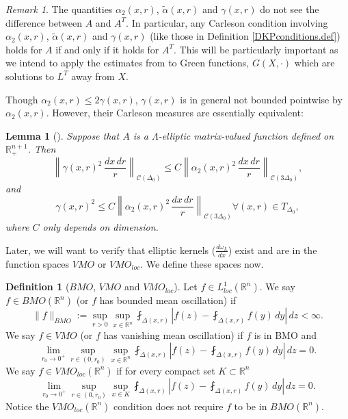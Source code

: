 \documentclass[11pt, a4paper,leqno]{amsart}
\theoremstyle{plain}
\newtheorem{lemma}[equation]{Lemma}
\theoremstyle{definition}
\newtheorem{definition}[equation]{Definition}
\theoremstyle{remark}
\newtheorem{remark}[equation]{Remark}
\numberwithin{equation}{section}
\newcommand{\rn}{\mathbb{R}^n}
\newcommand{\hm}{\omega}
\begin{document}
\begin{remark}\label{AvsAt.rmk}
 The quantities $\alpha_2(x,r)$,  $\tilde{\alpha}(x,r)$ and $\gamma(x,r)$ do not see the difference between $A$ and $A^T$. In particular, any Carleson condition involving $\alpha_2(x,r)$,  $\tilde{\alpha}(x,r)$ and $\gamma(x,r)$ (like those in Definition \ref{DKPconditions.def}) holds for $A$ if and only if it holds for $A^T$. This will be particularly important as we intend to apply the estimates from \cite{DLM} to Green functions, $G(X, \cdot)$ which are solutions to $L^T$ away from $X$.
\end{remark}

Though $\alpha_2(x,r) \leq 2\gamma(x,r)$, $\gamma(x,r)$ is in general not bounded pointwise by $\alpha_2(x,r)$. However, their Carleson measures are essentially equivalent:
%
\begin{lemma}[{\cite[Remark 4.22]{DLM}}]\label{gammabdalpha.lem}
Suppose that $A$ is a $\Lambda$-elliptic matrix-valued function defined on $\mathbb{R}^{n+1}_+$. Then
\[\left\|\gamma(x,r)^2 \, \frac{dx \, dr}{r} \right\|_{\mathcal{C}(\Delta_0)} \le C \left\|\alpha_2(x,r)^2 \, \frac{dx \, dr}{r} \right\|_{\mathcal{C}(3\Delta_0)},\]
and
\[\gamma(x,r)^2 \le C \left\|\alpha_2(x,r)^2 \, \frac{dx \, dr}{r} \right\|_{\mathcal{C}(3\Delta_0)} \forall (x,r) \in T_{\Delta_0},\]
where $C$ only depends on dimension.
\end{lemma}

Later, we will want to verify that elliptic kernels ($\tfrac{d\hm_L}{dx}$) exist and are in the function spaces $VMO$ or $VMO_{loc}$. We define these spaces now.
\begin{definition}[$BMO$, $VMO$ and $VMO_{loc}$]\label{BVMO.def}
Let $f \in L^1_{loc}(\rn)$. We say $f \in BMO(\rn)$ (or $f$ has bounded mean oscillation) if 
\[\|f\|_{BMO} := \sup_{r > 0} \sup_{x \in \rn} \fint_{\Delta(x,r)} \left|f(z) -\fint_{\Delta(x,r)}f(y)\,dy\right| \, dz < \infty.\]
We say $f \in VMO$ (or $f$ has vanishing mean oscillation) if $f$ is in BMO and 
\[ \lim_{r_0 \to 0^+} \sup_{r \in (0, r_0)} \sup_{x \in \rn} \fint_{\Delta(x,r)} \left|f(z) -\fint_{\Delta(x,r)}f(y)\,dy\right| \, dz = 0.\]
We say $f \in VMO_{loc}(\rn)$ if for every compact set $K \subset \rn$
\[ \lim_{r_0 \to 0^+} \sup_{r \in (0, r_0)} \sup_{x \in K} \fint_{\Delta(x,r)} \left|f(z) -\fint_{\Delta(x,r)}f(y)\,dy\right| \, dz = 0.\]
Notice the $VMO_{loc}(\rn)$ condition does not require $f$ to be in $BMO(\rn)$.
\end{definition}
\end{document}
